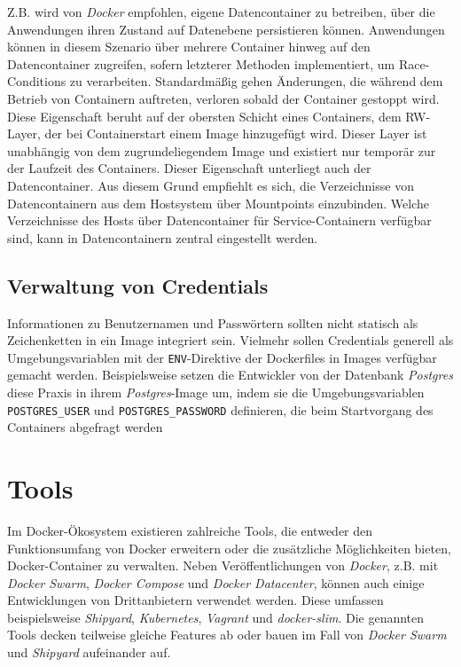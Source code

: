 \documentclass[../main.tex]{subfiles}
\begin{document}
      Z.B. wird von \emph{Docker} empfohlen, eigene Datencontainer zu betreiben, über die Anwendungen ihren Zustand auf Datenebene persistieren können. Anwendungen können in diesem Szenario über mehrere Container hinweg auf den Datencontainer zugreifen, sofern letzterer Methoden implementiert, um Race-Conditions zu verarbeiten. Standardmäßig gehen Änderungen, die während dem Betrieb von Containern auftreten, verloren sobald der Container gestoppt wird. Diese Eigenschaft beruht auf der obersten Schicht eines Containers, dem RW-Layer, der bei Containerstart einem Image hinzugefügt wird. Dieser Layer ist unabhängig von dem zugrundeliegendem Image und existiert nur temporär zur der Laufzeit des Containers. Dieser Eigenschaft unterliegt auch der Datencontainer. Aus diesem Grund empfiehlt es sich, die Verzeichnisse von Datencontainern aus dem Hostsystem über Mountpoints einzubinden. Welche Verzeichnisse des Hosts über Datencontainer für Service-Containern verfügbar sind, kann in Datencontainern zentral eingestellt werden.


    \subsection{Verwaltung von Credentials}
      Informationen zu Benutzernamen und Passwörtern sollten nicht statisch als Zeichenketten in ein Image integriert sein. Vielmehr sollen Credentials generell als Umgebungsvariablen mit der \texttt{ENV}-Direktive der Dockerfiles in Images verfügbar gemacht werden. Beispielsweise setzen die Entwickler von der Datenbank \emph{Postgres} diese Praxis in ihrem \emph{Postgres}-Image um, indem sie die Umgebungsvariablen \texttt{POSTGRES\_USER} und \texttt{POSTGRES\_PASSWORD} definieren, die beim Startvorgang des Containers abgefragt werden \cite{dockerHubPostgres}\cite{githubPostgresCredentialCheck}
  \section{Tools}
    Im Docker-Ökosystem existieren zahlreiche Tools, die entweder den Funktionsumfang von Docker erweitern oder die zusätzliche Möglichkeiten bieten, Docker-Container zu verwalten. Neben Veröffentlichungen von \emph{Docker}, z.B. mit \emph{Docker Swarm}, \emph{Docker Compose} und \emph{Docker Datacenter}, können auch einige Entwicklungen von Drittanbietern verwendet werden. Diese umfassen beispielsweise \emph{Shipyard}, \emph{Kubernetes}, \emph{Vagrant} und \emph{docker-slim}. Die genannten Tools decken teilweise gleiche Features ab oder bauen im Fall von \emph{Docker Swarm} und \emph{Shipyard} aufeinander auf.
\end{document}
